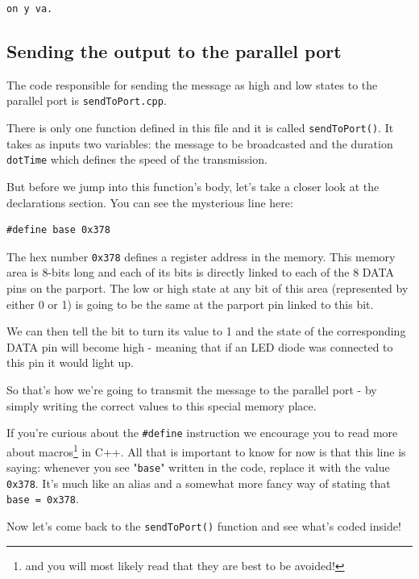 \documentclass[10pt]{report}
\begin{document}
\begin{snugshade}
\verb|on y va.|
\end{snugshade}

\newpage

\subsection{Sending the output to the parallel port}

The code responsible for sending the message as high and low states to the parallel port is \verb|sendToPort.cpp|.

There is only one function defined in this file and it is called \texttt{sendToPort()}. It takes as inputs two variables: the message to be broadcasted and the duration \texttt{dotTime} which defines the speed of the transmission.

But before we jump into this function's body, let's take a closer look at the declarations section. You can see the mysterious line here:

\begin{lstlisting}
#define base 0x378
\end{lstlisting}

The hex number \texttt{0x378} defines a register address in the memory. This memory area is 8-bits long and each of its bits is directly linked to each of the 8 DATA pins on the parport. The low or high state at any bit of this area (represented by either 0 or 1) is going to be the same at the parport pin linked to this bit.

We can then tell the bit to turn its value to 1 and the state of the corresponding DATA pin will become high - meaning that if an LED diode was connected to this pin it would light up.

So that's how we're going to transmit the message to the parallel port - by simply writing the correct values to this special memory place.

If you're curious about the \texttt{\#define} instruction we encourage you to read more about macros\footnote{and you will most likely read that they are best to be avoided!} in C++. All that is important to know for now is that this line is saying: whenever you see "\texttt{base}" written in the code, replace it with the value \texttt{0x378}. It's much like an alias and a somewhat more fancy way of stating that \texttt{base = 0x378}.

Now let's come back to the \texttt{sendToPort()} function and see what's coded inside!
\end{document}
